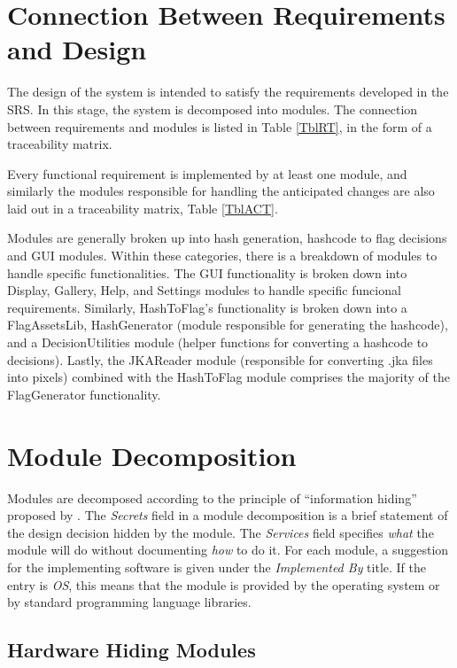 \documentclass[12pt, titlepage]{article}
\begin{document}
\section{Connection Between Requirements and Design} \label{SecConnection}

The design of the system is intended to satisfy the requirements developed in
the SRS. In this stage, the system is decomposed into modules. The connection
between requirements and modules is listed in Table \ref{TblRT}, in the form of a traceability matrix. 

Every functional requirement is implemented by at least one module, and similarly
the modules responsible for handling the anticipated changes are also laid out in a traceability matrix, Table \ref{TblACT}.

Modules are generally broken up into hash generation, hashcode to flag decisions and GUI modules. Within these
categories, there is a breakdown of modules to handle specific functionalities. The GUI functionality is broken down
into Display, Gallery, Help, and Settings modules to handle specific funcional requirements. Similarly, HashToFlag's functionality is broken down
into a FlagAssetsLib, HashGenerator (module responsible for generating the hashcode), and a DecisionUtilities module (helper functions for converting a hashcode to decisions).
Lastly, the JKAReader module (responsible for converting .jka files into pixels) combined with the HashToFlag module comprises the majority of the FlagGenerator functionality.


\section{Module Decomposition} \label{SecMD}

Modules are decomposed according to the principle of ``information hiding''
proposed by \citet{ParnasEtAl1984}. The \emph{Secrets} field in a module
decomposition is a brief statement of the design decision hidden by the
module. The \emph{Services} field specifies \emph{what} the module will do
without documenting \emph{how} to do it. For each module, a suggestion for the
implementing software is given under the \emph{Implemented By} title. If the
entry is \emph{OS}, this means that the module is provided by the operating
system or by standard programming language libraries.  

\subsection{Hardware Hiding Modules}
\end{document}
